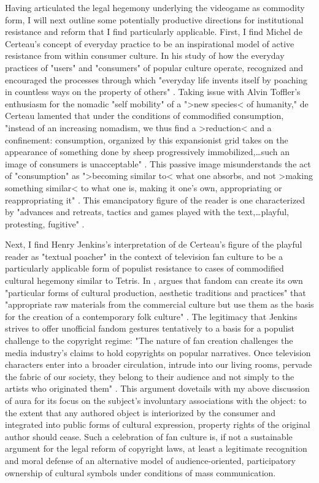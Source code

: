 Having articulated the legal hegemony underlying the videogame as commodity form, I will next outline some potentially productive directions for institutional resistance and reform that I find particularly applicable. First, I find Michel de Certeau's concept of everyday practice to be an inspirational model of active resistance from within consumer culture. In his study of how the everyday practices of "users" and "consumers" of popular culture operate, \citeauthor{DeCerteau1984} recognized and encouraged the processes through which "everyday life invents itself by poaching in countless ways on the property of others" \autocite[xii]{DeCerteau1984}. Taking issue with Alvin Toffler's enthusiasm for the nomadic "self mobility" of a ">new species< of humanity," de Certeau lamented that under the conditions of commodified consumption, "instead of an increasing nomadism, we thus find a >reduction< and a confinement: consumption, organized by this expansionist grid takes on the appearance of something done by sheep progressively immobilized,…such an image of consumers is unacceptable" \autocite[165--6]{DeCerteau1984}. This passive image misunderstands the act of "consumption" as ">becoming similar to< what one absorbs, and not >making something similar< to what one is, making it one's own, appropriating or reappropriating it" \autocite[166]{DeCerteau1984}. This emancipatory figure of the reader is one characterized by "advances and retreats, tactics and games played with the text,…playful, protesting, fugitive" \autocite[175]{DeCerteau1984}.

Next, I find Henry Jenkins's interpretation of de Certeau's figure of the playful reader as "textual poacher" in the context of television fan culture to be a particularly applicable form of populist resistance to cases of commodified cultural hegemony similar to Tetris. In , \citeauthor{Jenkins2012-wc} argues that fandom can create its own "particular forms of cultural production, aesthetic traditions and practices" that "appropriate raw materials from the commercial culture but use them as the basis for the creation of a contemporary folk culture" \autocite*[279]{Jenkins2012-wc}. The legitimacy that Jenkins strives to offer unofficial fandom gestures tentatively to a basis for a populist challenge to the copyright regime: "The nature of fan creation challenges the media industry's claims to hold copyrights on popular narratives. Once television characters enter into a broader circulation, intrude into our living rooms, pervade the fabric of our society, they belong to their audience and not simply to the artists who originated them" \autocite[279]{Jenkins2012-wc}. This argument dovetails with my above discussion of aura for its focus on the subject's involuntary associations with the object: to the extent that any authored object is interiorized by the consumer and integrated into public forms of cultural expression, property rights of the original author should cease. Such a celebration of fan culture is, if not a sustainable argument for the legal reform of copyright laws, at least a legitimate recognition and moral defense of an alternative model of audience-oriented, participatory ownership of cultural symbols under conditions of mass communication.

